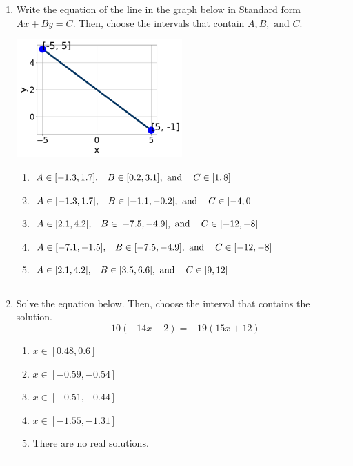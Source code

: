 \documentclass[14pt]{extbook}
\newcommand{\litem}[1]{\item#1\hspace*{-1cm}\rule{\textwidth}{0.4pt}}
\begin{document}
\begin{enumerate}
\litem{
Write the equation of the line in the graph below in Standard form $Ax+By=C$. Then, choose the intervals that contain $A, B, \text{ and } C$.
\begin{center}
    \includegraphics[width=0.5\textwidth]{../Figures/linearGraphToStandardC.png}
\end{center}
\begin{enumerate}[label=\Alph*.]
\item \( A \in [-1.3, 1.7], \hspace{3mm} B \in [0.2, 3.1], \text{ and } \hspace{3mm} C \in [1, 8] \)
\item \( A \in [-1.3, 1.7], \hspace{3mm} B \in [-1.1, -0.2], \text{ and } \hspace{3mm} C \in [-4, 0] \)
\item \( A \in [2.1, 4.2], \hspace{3mm} B \in [-7.5, -4.9], \text{ and } \hspace{3mm} C \in [-12, -8] \)
\item \( A \in [-7.1, -1.5], \hspace{3mm} B \in [-7.5, -4.9], \text{ and } \hspace{3mm} C \in [-12, -8] \)
\item \( A \in [2.1, 4.2], \hspace{3mm} B \in [3.5, 6.6], \text{ and } \hspace{3mm} C \in [9, 12] \)

\end{enumerate} }
\litem{
Solve the equation below. Then, choose the interval that contains the solution.\[ -10(-14x -2) = -19(15x + 12) \]\begin{enumerate}[label=\Alph*.]
\item \( x \in [0.48, 0.6] \)
\item \( x \in [-0.59, -0.54] \)
\item \( x \in [-0.51, -0.44] \)
\item \( x \in [-1.55, -1.31] \)
\item \( \text{There are no real solutions.} \)


\end{enumerate}}
\end{enumerate}
\end{document}
